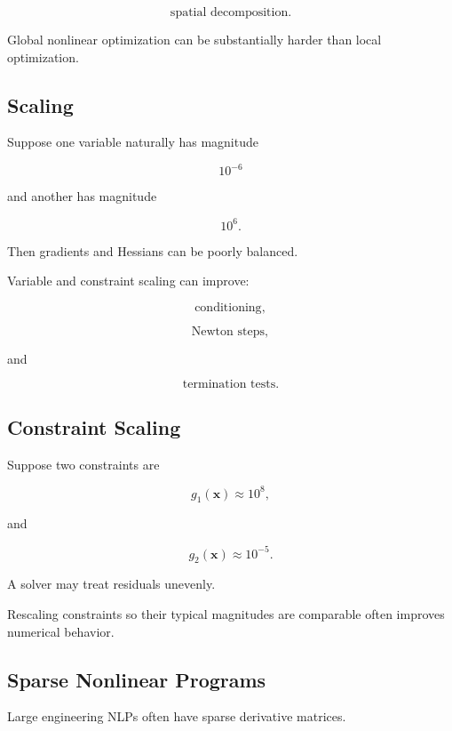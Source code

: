 \[
\boxed{
\text{spatial decomposition}.
}
\]

Global nonlinear optimization can be substantially harder than local
optimization.

\subsection{Scaling}
\label{subsec:nlp-scaling}

Suppose one variable naturally has magnitude

\[
10^{-6}
\]

and another has magnitude

\[
10^6.
\]

Then gradients and Hessians can be poorly balanced.

Variable and constraint scaling can improve:

\[
\boxed{
\text{conditioning},
}
\]

\[
\boxed{
\text{Newton steps},
}
\]

and

\[
\boxed{
\text{termination tests}.
}
\]

\subsection{Constraint Scaling}
\label{subsec:nlp-constraint-scaling}

Suppose two constraints are

\[
g_1(\mathbf{x})\approx10^8,
\]

and

\[
g_2(\mathbf{x})\approx10^{-5}.
\]

A solver may treat residuals unevenly.

Rescaling constraints so their typical magnitudes are comparable often
improves numerical behavior.

\subsection{Sparse Nonlinear Programs}
\label{subsec:sparse-nonlinear-programs}

Large engineering NLPs often have sparse derivative matrices.

